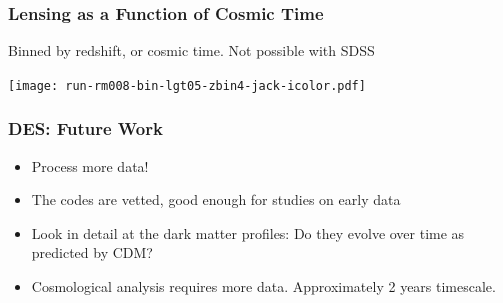 \documentclass{beamer}
\begin{document}
\frame
{

    \frametitle{Lensing as a Function of Cosmic Time}
 
    \begin{minipage}{\linewidth}
        \vspace{5mm}
        Binned by redshift, or cosmic time.  {\color{gold} Not possible with SDSS }
        \vspace{5mm}
    \end{minipage}
    \begin{minipage}{\linewidth}
        \centering
        \texttt{[image: run-rm008-bin-lgt05-zbin4-jack-icolor.pdf]}
    \end{minipage}

}

\frame
{
    \frametitle{DES: Future Work}

 
    \begin{itemize}

        \item Process more data!

        \item The codes are vetted, good enough for studies on early data

        \item Look in detail at the dark matter profiles: Do they evolve over
            time as predicted by CDM?

        \item Cosmological analysis requires more data.  Approximately 2 years
            timescale.

    \end{itemize}

}
\end{document}
